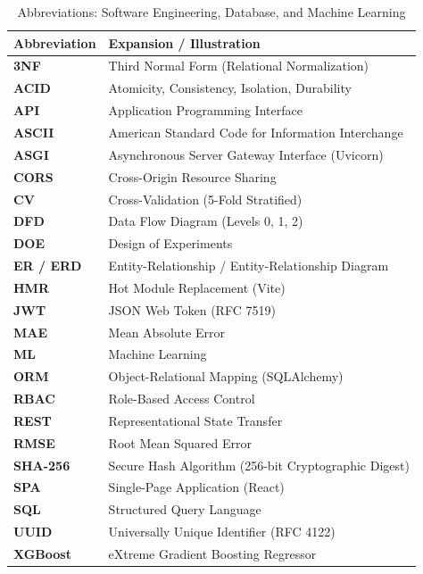 \documentclass[12pt,a4paper,oneside]{report}
\begin{document}
{{{\begin{table}[!htbp]
\centering
\footnotesize
\setlength{\tabcolsep}{6pt}
\renewcommand{\arraystretch}{1.2}
\caption{Abbreviations: Software Engineering, Database, and Machine Learning}
\label{tab:abbrev_software}
\begin{tabular}{|p{3.2cm}|p{11.2cm}|}
\hline
\textbf{Abbreviation} & \textbf{Expansion / Illustration} \\
\hline
\textbf{3NF} & Third Normal Form (Relational Normalization) \\
\textbf{ACID} & Atomicity, Consistency, Isolation, Durability \\
\textbf{API} & Application Programming Interface \\
\textbf{ASCII} & American Standard Code for Information Interchange \\
\textbf{ASGI} & Asynchronous Server Gateway Interface (Uvicorn) \\
\textbf{CORS} & Cross-Origin Resource Sharing \\
\textbf{CV} & Cross-Validation (5-Fold Stratified) \\
\textbf{DFD} & Data Flow Diagram (Levels 0, 1, 2) \\
\textbf{DOE} & Design of Experiments \\
\textbf{ER / ERD} & Entity-Relationship / Entity-Relationship Diagram \\
\textbf{HMR} & Hot Module Replacement (Vite) \\
\textbf{JWT} & JSON Web Token (RFC 7519) \\
\textbf{MAE} & Mean Absolute Error \\
\textbf{ML} & Machine Learning \\
\textbf{ORM} & Object-Relational Mapping (SQLAlchemy) \\
\textbf{RBAC} & Role-Based Access Control \\
\textbf{REST} & Representational State Transfer \\
\textbf{RMSE} & Root Mean Squared Error \\
\textbf{SHA-256} & Secure Hash Algorithm (256-bit Cryptographic Digest) \\
\textbf{SPA} & Single-Page Application (React) \\
\textbf{SQL} & Structured Query Language \\
\textbf{UUID} & Universally Unique Identifier (RFC 4122) \\
\textbf{XGBoost} & eXtreme Gradient Boosting Regressor \\
\hline
\end{tabular}
\end{table}


}}}
\end{document}
